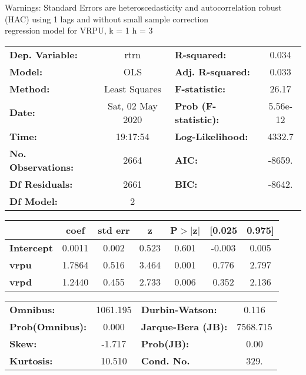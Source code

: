 Warnings: \newline
 [1] Standard Errors are heteroscedasticity and autocorrelation robust (HAC) using 1 lags and without small sample correction\\ 

regression model for VRPU, k = 1 h = 3\begin{center}
\begin{tabular}{lclc}
\toprule
\textbf{Dep. Variable:}    &       rtrn       & \textbf{  R-squared:         } &     0.034   \\
\textbf{Model:}            &       OLS        & \textbf{  Adj. R-squared:    } &     0.033   \\
\textbf{Method:}           &  Least Squares   & \textbf{  F-statistic:       } &     26.17   \\
\textbf{Date:}             & Sat, 02 May 2020 & \textbf{  Prob (F-statistic):} &  5.56e-12   \\
\textbf{Time:}             &     19:17:54     & \textbf{  Log-Likelihood:    } &    4332.7   \\
\textbf{No. Observations:} &        2664      & \textbf{  AIC:               } &    -8659.   \\
\textbf{Df Residuals:}     &        2661      & \textbf{  BIC:               } &    -8642.   \\
\textbf{Df Model:}         &           2      & \textbf{                     } &             \\
\bottomrule
\end{tabular}
\begin{tabular}{lcccccc}
                   & \textbf{coef} & \textbf{std err} & \textbf{z} & \textbf{P$> |$z$|$} & \textbf{[0.025} & \textbf{0.975]}  \\
\midrule
\textbf{Intercept} &       0.0011  &        0.002     &     0.523  &         0.601        &       -0.003    &        0.005     \\
\textbf{vrpu}      &       1.7864  &        0.516     &     3.464  &         0.001        &        0.776    &        2.797     \\
\textbf{vrpd}      &       1.2440  &        0.455     &     2.733  &         0.006        &        0.352    &        2.136     \\
\bottomrule
\end{tabular}
\begin{tabular}{lclc}
\textbf{Omnibus:}       & 1061.195 & \textbf{  Durbin-Watson:     } &    0.116  \\
\textbf{Prob(Omnibus):} &   0.000  & \textbf{  Jarque-Bera (JB):  } & 7568.715  \\
\textbf{Skew:}          &  -1.717  & \textbf{  Prob(JB):          } &     0.00  \\
\textbf{Kurtosis:}      &  10.510  & \textbf{  Cond. No.          } &     329.  \\
\bottomrule
\end{tabular}
\end{center}


